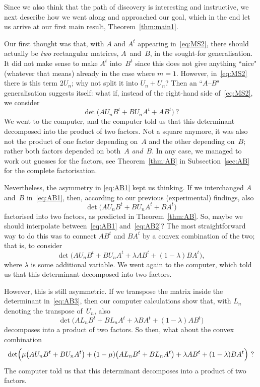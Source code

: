 \documentclass[12pt,reqno]{amsart}
\numberwithin{equation}{section}
\theoremstyle{definition}
\theoremstyle{remark}
\def\la{\lambda}
\begin{document}
\medskip
Since we also think that the path of discovery is interesting and
instructive,
we next describe how we went along and approached our goal, which in
the end let us arrive at our first main result, Theorem~\ref{thm:main1}.

Our first thought was that, with $A$ and $A^t$ appearing
in~\eqref{eq:MS2}, there should actually be {\it two} rectangular
matrices, $A$~and~$B$, in the sought-for generalisation.
It did not make sense to make $A^t$ into~$B^t$ since this does
not give anything ``nice" (whatever that means) already in the
case where $m=1$. However, in~\eqref{eq:MS2} there is this term
$2U_n$; why not split it into $U_n+U_n$? Then an ``$A$--$B$"
generalisation suggests itself: what if, instead of the right-hand
side of~\eqref{eq:MS2}, we consider
\begin{equation} \label{eq:AB1} 
\det\bigl(AU_nB^t+BU_nA^t+AB^t\bigr)\ ?
\end{equation}
We went to the computer, and the computer told us that this
determinant decomposed into the product of two factors.
Not a square anymore, it was also not the product of one factor
depending on~$A$ and the other depending on~$B$; rather both
factors depended on both~$A$ {\it and\/}~$B$. In any case, we
managed to work out guesses for the factors, see Theorem~\ref{thm:AB} in
Subsection~\ref{sec:AB}
for the complete factorisation.

Nevertheless, the asymmetry in \eqref{eq:AB1} kept us thinking.
If we interchanged $A$ and~$B$ in~\eqref{eq:AB1}, then, according to
our previous (experimental) findings, also
\begin{equation} \label{eq:AB2} 
\det\bigl(AU_nB^t+BU_nA^t+BA^t\bigr)
\end{equation}
factorised into two factors, as predicted in Theorem~\ref{thm:AB}.
So, maybe we should interpolate between~\eqref{eq:AB1}
and~\eqref{eq:AB2}? The most straightforward way to do this
was to connect $AB^t$ and $BA^t$ by a convex combination
of the two; that is, to consider
\begin{equation} \label{eq:AB3} 
\det\bigl(AU_nB^t+BU_nA^t+\la AB^t+(1-\la)BA^t\bigr),
\end{equation}
where $\la$ is some additional variable. We went again to the
computer, which told us that this determinant decomposed into
two factors.

However, this is still asymmetric. If we transpose the matrix inside
the determinant in~\eqref{eq:AB3}, then our computer calculations
show that, with $L_n$ denoting the transpose of~$U_n$, also
$$
\det\bigl(AL_nB^t+BL_nA^t+\la BA^t+(1-\la)AB^t\bigr)
$$
decomposes into a product of two factors. So then, what about
the convex combination
\begin{equation} \label{eq:AB4} 
\det\Bigl(\mu\bigl(AU_nB^t+BU_nA^t\bigr)
+(1-\mu)\bigl(AL_nB^t+BL_nA^t\bigr)
+\la AB^t+(1-\la)BA^t\Bigr)\ ?
\end{equation}
The computer told us that this determinant decomposes into a
product of two factors.
\end{document}
